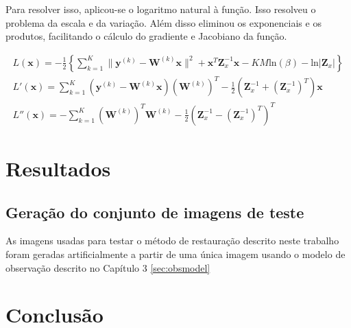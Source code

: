\documentclass[12pt,openright,oneside,a4paper,english,brazil]{abntex2}
\begin{document}
Para resolver isso, aplicou-se o logaritmo natural à função. Isso resolveu o problema da escala e da variação.
Além disso eliminou os exponenciais e os produtos, facilitando o cálculo do gradiente e Jacobiano da função.

\begin{gather}
	L(\mathbf{x}) = -\frac{1}{2} \left\{ \sum^K_{k=1} \|\mathbf{y}^{(k)} - \mathbf{W}^{(k)} \mathbf{x} \|^2 + \mathbf{x}^T\mathbf{Z}^{-1}_x\mathbf{x} - KM\mathrm{ln}(\beta) - \mathrm{ln}|\mathbf{Z}_x| \right\} \\ 
	L'(\mathbf{x}) =  \sum^K_{k=1}  (\mathbf{y}^{(k)} - \mathbf{W}^{(k)}\mathbf{x})(\mathbf{W}^{(k)})^T  - \frac{1}{2}(\mathbf{Z}^{-1}_x + (\mathbf{Z}^{-1}_x)^T)\mathbf{x}  \\
	L''(\mathbf{x}) =  -\sum^K_{k=1} (\mathbf{W}^{(k)})^T\mathbf{W}^{(k)} - \frac{1}{2}(\mathbf{Z}^{-1}_x - (\mathbf{Z}^{-1}_x)^T)^T
\end{gather}

\chapter{Resultados}
\section{Geração do conjunto de imagens de teste}
As imagens usadas para testar o método de restauração descrito neste trabalho foram geradas artificialmente a partir de uma única imagem usando o modelo de observação descrito no Capítulo 3 \ref{sec:obsmodel}


\chapter{Conclusão}

\postextual



\end{document}
